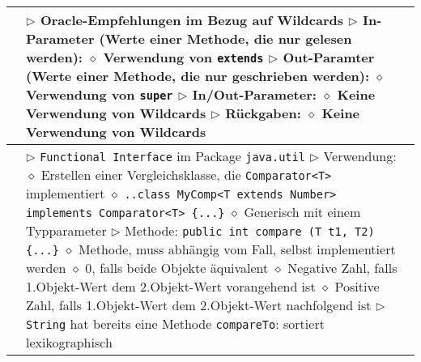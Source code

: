\begin{longtable}{ | p{4cm} p{13.5cm} | }
	\makecell[l]{Empfehlungen} & \makecell[l]{$\rhd$ Oracle-Empfehlungen im Bezug auf Wildcards \\
	$\rhd$ In-Parameter (Werte einer Methode, die nur gelesen werden): \\ 
	\hspace{0.4cm} $\diamond$ Verwendung von \texttt{extends} \\
	$\rhd$ Out-Paramter (Werte einer Methode, die nur geschrieben werden): \\
	\hspace{0.4cm} $\diamond$ Verwendung von \texttt{super} \\
	$\rhd$ In/Out-Parameter: \\
	\hspace{0.4cm} $\diamond$ Keine Verwendung von Wildcards \\
	$\rhd$ Rückgaben: \\
	\hspace{0.4cm} $\diamond$ Keine Verwendung von Wildcards} \\ \hline

	\makecell[l]{Interface Comparator} & \makecell[l]{$\rhd$  \texttt{Functional Interface} im Package \texttt{java.util} \\
	$\rhd$ Verwendung: \\
	\hspace{0.4cm} $\diamond$ Erstellen einer Vergleichsklasse, die \texttt{Comparator<T>} implementiert \\
	\hspace{0.4cm} $\diamond$ \texttt{..class MyComp<T extends Number> implements Comparator<T> \{...\}} \\
	\hspace{0.4cm} $\diamond$ Generisch mit einem Typparameter \\
	$\rhd$ Methode: \texttt{public int compare (T t1, T2) \{...\}} \\
	\hspace{0.4cm} $\diamond$ Methode, muss abhängig vom Fall, selbst implementiert werden \\
	\hspace{0.4cm} $\diamond$ 0, falls beide Objekte äquivalent \\
	\hspace{0.4cm} $\diamond$ Negative Zahl, falls 1.Objekt-Wert dem 2.Objekt-Wert vorangehend ist \\
	\hspace{0.4cm} $\diamond$ Positive Zahl, falls 1.Objekt-Wert dem 2.Objekt-Wert nachfolgend ist \\
	$\rhd$ \texttt{String} hat bereits eine Methode \texttt{compareTo}: sortiert lexikographisch }  \\ \hline


\end{longtable}
